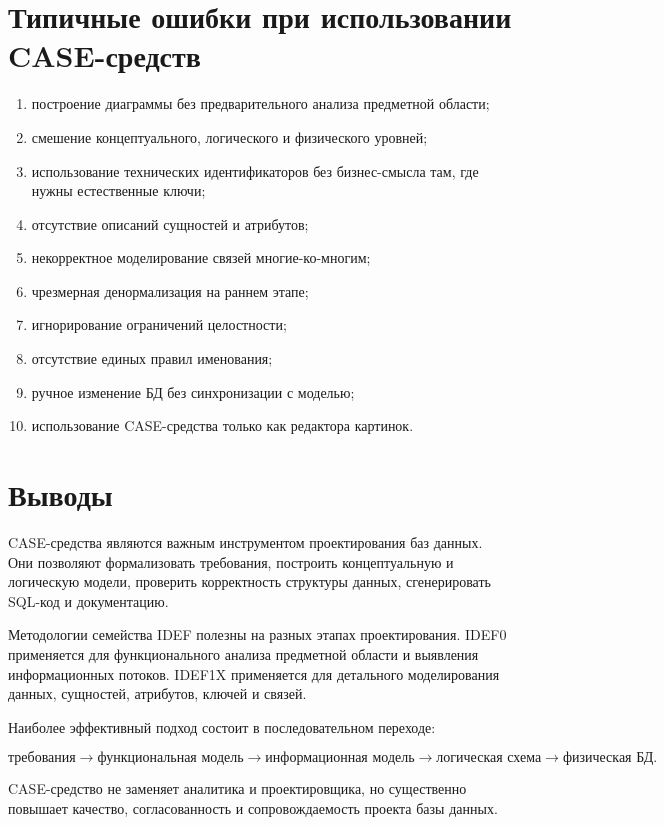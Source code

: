 \documentclass[12pt,a4paper]{article}
\theoremstyle{remark}
\begin{document}
\section{Типичные ошибки при использовании CASE-средств}

\begin{enumerate}
    \item построение диаграммы без предварительного анализа предметной области;
    \item смешение концептуального, логического и физического уровней;
    \item использование технических идентификаторов без бизнес-смысла там, где нужны естественные ключи;
    \item отсутствие описаний сущностей и атрибутов;
    \item некорректное моделирование связей многие-ко-многим;
    \item чрезмерная денормализация на раннем этапе;
    \item игнорирование ограничений целостности;
    \item отсутствие единых правил именования;
    \item ручное изменение БД без синхронизации с моделью;
    \item использование CASE-средства только как редактора картинок.
\end{enumerate}

\section{Выводы}

CASE-средства являются важным инструментом проектирования баз данных. Они позволяют формализовать требования, построить концептуальную и логическую модели, проверить корректность структуры данных, сгенерировать SQL-код и документацию.

Методологии семейства IDEF полезны на разных этапах проектирования. IDEF0 применяется для функционального анализа предметной области и выявления информационных потоков. IDEF1X применяется для детального моделирования данных, сущностей, атрибутов, ключей и связей.

Наиболее эффективный подход состоит в последовательном переходе:

\[
    \text{требования}
    \rightarrow
    \text{функциональная модель}
    \rightarrow
    \text{информационная модель}
    \rightarrow
    \text{логическая схема}
    \rightarrow
    \text{физическая БД}.
\]

CASE-средство не заменяет аналитика и проектировщика, но существенно повышает качество, согласованность и сопровождаемость проекта базы данных.
\end{document}
